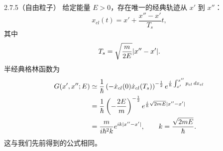 \begin{example}{2.7.5（自由粒子）}
  给定能量 $E>0$，存在唯一的经典轨迹从 $x'$ 到 $x''$：
  \[
  x_{cl}(t)=x'+\frac{x''-x'}{T_s}t,
  \]
  其中
  \[
  T_s=\sqrt{\frac{m}{2E}}\lvert x''-x'\rvert.
  \]
  半经典格林函数为
  \[
  \begin{aligned}
  G(x',x'';E)
  &\simeq\frac1{\hbar}\left(-\dot x_{cl}(0)\dot x_{cl}(T_s)\right)^{-\frac12}
  e^{\frac{i}{\hbar}\int_{x'}^{x''}p_{cl}\,d x_{cl}}\\
  &=\frac1{\hbar}\left(-\frac{2E}{m}\right)^{-\frac12}
  e^{\frac{i}{\hbar}\sqrt{2mE}\lvert x''-x'\rvert}\\
  &=\frac{m}{i\hbar^2k}e^{i k\lvert x''-x'\rvert},
  \qquad k=\frac{\sqrt{2mE}}{\hbar}.
  \end{aligned}
  \]
  这与我们先前得到的公式相同。
\end{example}


